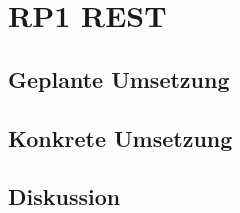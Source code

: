 \section{RP1 REST}
\label{sec:principle-rp1-rest}

\subsection*{Geplante Umsetzung}


\subsection*{Konkrete Umsetzung}


\subsection*{Diskussion}
